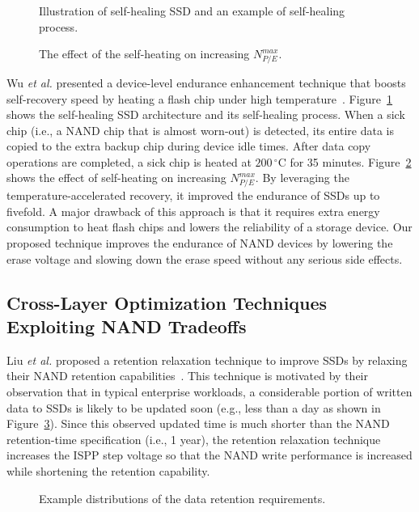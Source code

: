 \begin{figure}[t]
\centering
\caption{Illustration of self-healing SSD and an example of self-healing process.}
\label{fig:RelatedWorks_SelfHealing1}
\end{figure}


\begin{figure}[t]
\centering
\caption{The effect of the self-heating on increasing $N_{P/E}^{max}$.}
\label{fig:RelatedWorks_SelfHealing2}
\end{figure}

Wu \textit{et al.} presented a device-level endurance enhancement technique that boosts self-recovery speed by heating a flash chip under high temperature~\cite{SelfHealing_Wu}.
Figure~\ref{fig:RelatedWorks_SelfHealing1} shows the self-healing SSD architecture and its self-healing process.
When a sick chip (i.e., a NAND chip that is almost worn-out) is detected, its entire data is copied to the extra backup chip during device idle times.
After data copy operations are completed, a sick chip is heated at $200\,^{\circ}\mathrm{C}$ for 35 minutes.
Figure~\ref{fig:RelatedWorks_SelfHealing2} shows the effect of self-heating on increasing $N_{P/E}^{max}$.
By leveraging the temperature-accelerated recovery, it improved the endurance of SSDs up to fivefold.
A major drawback of this approach is that it requires extra energy consumption to heat flash chips and lowers the reliability of a storage
device.
Our proposed technique improves the endurance of NAND devices by lowering the erase voltage and slowing down the erase speed without any serious side effects.


\subsection{Cross-Layer Optimization Techniques Exploiting NAND Tradeoffs}
\label{subsec:Background_CrosslayerOptimizationTechniques}

Liu \textit{et al.} proposed a retention relaxation technique to improve SSDs by relaxing their NAND retention capabilities~\cite{RetentionRelaxation_Liu}.
This technique is motivated by their observation that in typical enterprise workloads, a considerable portion of written data to SSDs is likely to be updated soon (e.g., less than a day as shown in Figure~\ref{fig:RelatedWorks_RetentionRelaxation1}).
Since this observed updated time is much shorter than the NAND retention-time specification (i.e., 1 year), the retention relaxation technique increases the ISPP step voltage so that the NAND write performance is increased while shortening the retention capability.


\begin{figure}[t]
\centering
\caption{Example distributions of the data retention requirements.}
\label{fig:RelatedWorks_RetentionRelaxation1}
\end{figure}


